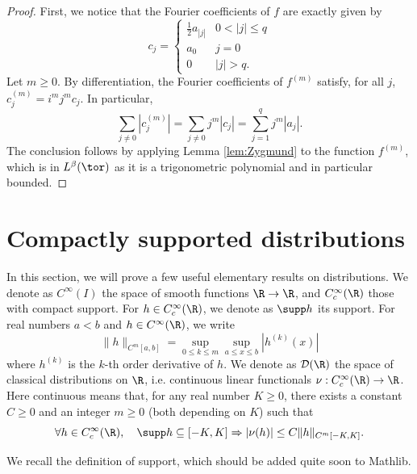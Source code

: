 \begin{proof}
  First, we notice that the Fourier coefficients of $f$ are exactly
  given by
  \begin{equation*}
    c_j =
    \begin{cases}
      \frac{1}{2} a_{|j|} & 0 < |j| \leq q \\
      a_0 & j=0 \\
      0 & |j| > q.
    \end{cases}
  \end{equation*}
  Let $m \geq 0$. By differentiation,
  the Fourier coefficients of $f^{(m)}$ satisfy, for
  all $j$, $c_j^{(m)} =
    i^m j^m c_j$.
  In particular,
  \begin{equation*}
    \sum_{j \neq 0} |c_j^{(m)}|
    = \sum_{j \neq 0} j^m |c_j|
    = \sum_{j =1}^q j^m |a_j|.
  \end{equation*}
  The conclusion follows by applying Lemma \ref{lem:Zygmund} to the function $f^{(m)}$,
  which is in $L^\beta(\tor)$ as it is a trigonometric polynomial and in particular bounded.
\end{proof}

\section{Compactly supported distributions}

In this section, we will prove a few useful elementary results on distributions.
We denote as $C^\infty(I)$ the space of smooth functions $\R \rightarrow \R$, and $C^\infty_c(\R)$
those with compact support. For $h \in C^\infty_c(\R)$, we denote as $\supp h$ its support.
For real numbers $a < b$ and $h \in C^\infty(\R)$, we write
\begin{equation*}
  \|h\|_{C^m[a,b]} = \sup_{0 \leq k \leq m} \sup_{a \leq x \leq b} |h^{(k)}(x)|
\end{equation*}
where $h^{(k)}$ is the $k$-th order derivative of $h$.
We denote as $\mathcal{D}(\R)$ the space of classical distributions on $\R$, i.e. continuous
linear functionals $\nu : C^\infty_c(\R) \rightarrow \R$.
Here continuous means that, for any real number $K \geq 0$,
there exists a constant $C \geq 0$ and an integer $m \geq 0$ (both depending on $K$) such that
\begin{equation*}
  \forall h \in C^\infty_c(\R), \quad
  \supp h \subseteq [-K,K] \Rightarrow  |\nu(h)| \leq C \|h\|_{C^m[-K,K]}.
\end{equation*}

We recall the definition of support, which should be added quite soon to Mathlib.

